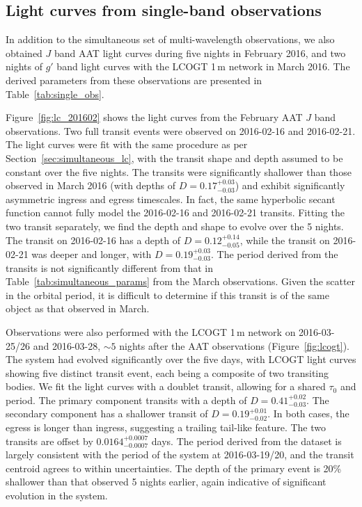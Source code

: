 \documentclass[apj]{emulateapj}
\begin{document}
\subsection{Light curves from single-band observations}
\label{sec:single_band_lc}


In addition to the simultaneous set of multi-wavelength observations, we also obtained $J$ band AAT light curves during five nights in February 2016, and two nights of $g'$ band light curves with the LCOGT 1\,m network in March 2016. The derived parameters from these observations are presented in Table~\ref{tab:single_obs}. 

Figure~\ref{fig:lc_201602} shows the light curves from the February AAT $J$ band observations. Two full transit events were observed on 2016-02-16 and 2016-02-21. The light curves were fit with the same procedure as per Section~\ref{sec:simultaneous_lc}, with the transit shape and depth assumed to be constant over the five nights. The transits were significantly shallower than those observed in March 2016 (with depths of $D=0.17_{-0.03}^{+0.03}$) and exhibit significantly asymmetric ingress and egress timescales. In fact, the same hyperbolic secant function cannot fully model the 2016-02-16 and 2016-02-21 transits. Fitting the two transit separately, we find the depth and shape to evolve over the 5 nights. The transit on 2016-02-16 has a depth of $D = 0.12_{-0.05}^{+0.14}$, while the transit on 2016-02-21 was deeper and longer, with $D = 0.19_{-0.03}^{+0.03}$. The period derived from the transits is not significantly different from that in Table~\ref{tab:simultaneous_params} from the March observations. Given the scatter in the orbital period, it is difficult to determine if this transit is of the same object as that observed in March.

Observations were also performed with the LCOGT 1\,m network on 2016-03-25/26 and 2016-03-28, $\sim 5$ nights after the AAT observations (Figure~\ref{fig:lcogt}). The system had evolved significantly over the five days, with LCOGT light curves showing five distinct transit event, each being a composite of two transiting bodies. We fit the light curves with a doublet transit, allowing for a shared $\tau_0$ and period. The primary component transits with a depth of $D = 0.41_{-0.03}^{+0.02}$. The secondary component has a shallower transit of $D = 0.19_{-0.02}^{+0.01}$. In both cases, the egress is longer than ingress, suggesting a trailing tail-like feature. The two transits are offset by $0.0164_{-0.0007}^{+0.0007}$ days. The period derived from the dataset is largely consistent with the period of the system at 2016-03-19/20, and the transit centroid agrees to within uncertainties. The depth of the primary event is 20\% shallower than that observed 5 nights earlier, again indicative of significant evolution in the system. 
\end{document}
